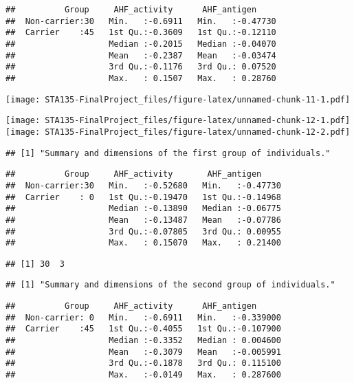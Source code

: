 \documentclass[]{article}
\begin{document}
\begin{verbatim}
##          Group     AHF_activity      AHF_antigen      
##  Non-carrier:30   Min.   :-0.6911   Min.   :-0.47730  
##  Carrier    :45   1st Qu.:-0.3609   1st Qu.:-0.12110  
##                   Median :-0.2015   Median :-0.04070  
##                   Mean   :-0.2387   Mean   :-0.03474  
##                   3rd Qu.:-0.1176   3rd Qu.: 0.07520  
##                   Max.   : 0.1507   Max.   : 0.28760
\end{verbatim}

\texttt{[image: STA135-FinalProject\_files/figure-latex/unnamed-chunk-11-1.pdf]}

\texttt{[image: STA135-FinalProject\_files/figure-latex/unnamed-chunk-12-1.pdf]}
\texttt{[image: STA135-FinalProject\_files/figure-latex/unnamed-chunk-12-2.pdf]}

\begin{verbatim}
## [1] "Summary and dimensions of the first group of individuals."
\end{verbatim}

\begin{verbatim}
##          Group     AHF_activity       AHF_antigen      
##  Non-carrier:30   Min.   :-0.52680   Min.   :-0.47730  
##  Carrier    : 0   1st Qu.:-0.19470   1st Qu.:-0.14968  
##                   Median :-0.13890   Median :-0.06775  
##                   Mean   :-0.13487   Mean   :-0.07786  
##                   3rd Qu.:-0.07805   3rd Qu.: 0.00955  
##                   Max.   : 0.15070   Max.   : 0.21400
\end{verbatim}

\begin{verbatim}
## [1] 30  3
\end{verbatim}

\begin{verbatim}
## [1] "Summary and dimensions of the second group of individuals."
\end{verbatim}

\begin{verbatim}
##          Group     AHF_activity      AHF_antigen       
##  Non-carrier: 0   Min.   :-0.6911   Min.   :-0.339000  
##  Carrier    :45   1st Qu.:-0.4055   1st Qu.:-0.107900  
##                   Median :-0.3352   Median : 0.004600  
##                   Mean   :-0.3079   Mean   :-0.005991  
##                   3rd Qu.:-0.1878   3rd Qu.: 0.115100  
##                   Max.   :-0.0149   Max.   : 0.287600
\end{verbatim}
\end{document}
